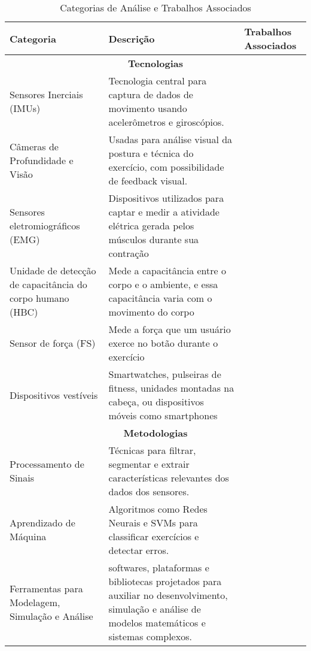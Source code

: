 \documentclass[conference]{IEEEtran}
\begin{document}
\begin{table*}
    \centering
    \caption{Categorias de Análise e Trabalhos Associados} 
    \begin{tabularx}{\textwidth}{|p{3cm}|X|p{3cm}|}
    \hline
    \textbf{Categoria} & \textbf{Descrição} & \textbf{Trabalhos Associados} \\ \hline
    \multicolumn{3}{|c|}{\textbf{Tecnologias}} \\ \hline
    Sensores Inerciais (IMUs) & Tecnologia central para captura de dados de movimento usando acelerômetros e giroscópios. & \cite{Asghar2023, Bian2022, Ceccarelli2024, colpitts2023kinematics, Hussain2022, Islam2021, Kwon2021, Mekruksavanich2024, Michaud2021, papadopoulou2023towards, Ponton2023, Tian2021} \\ \hline
    Câmeras de Profundidade e Visão & Usadas para análise visual da postura e técnica do exercício, com possibilidade de feedback visual. & \cite{colpitts2023kinematics, Michaud2021, Hussain2022} \\ \hline
    Sensores eletromiográficos (EMG) & Dispositivos utilizados para captar e medir a atividade elétrica gerada pelos músculos durante sua contração & \cite{Mekruksavanich2024} \\ \hline
    Unidade de detecção de capacitância do corpo humano (HBC) & Mede a capacitância entre o corpo e o ambiente, e essa capacitância varia com o movimento do corpo & \cite{Bian2022} \\ \hline
    Sensor de força (FS) & Mede a força que um usuário exerce no botão durante o exercício & \cite{Ceccarelli2024} \\ \hline
    Dispositivos vestíveis & Smartwatches, pulseiras de fitness, unidades montadas na cabeça, ou dispositivos móveis como smartphones & \cite{Kwon2021, Hussain2022} \\ \hline

    \multicolumn{3}{|c|}{\textbf{Metodologias}} \\ \hline
    Processamento de Sinais & Técnicas para filtrar, segmentar e extrair características relevantes dos dados dos sensores. & \cite{Tian2021, Ponton2023, Islam2021, papadopoulou2023towards, Mekruksavanich2024,Kwon2021} \\ \hline
    Aprendizado de Máquina & Algoritmos como Redes Neurais e SVMs para classificar exercícios e detectar erros. & \cite{Ponton2023, papadopoulou2023towards, Mekruksavanich2024, Bian2022, Kwon2021, Hussain2022} \\ \hline
    Ferramentas para Modelagem, Simulação e Análise &  softwares, plataformas e bibliotecas projetados para auxiliar no desenvolvimento, simulação e análise de modelos matemáticos e sistemas complexos. & \cite{colpitts2023kinematics, Asghar2023, Michaud2021} \\ \hline


\end{tabularx}
\end{table*}
\end{document}
